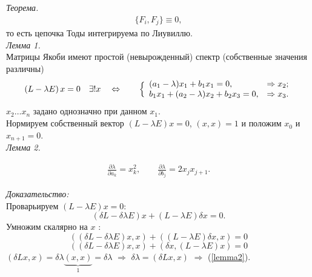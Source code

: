 \documentclass[a4paper,12pt]{article}
\theoremstyle{definition}
\theoremstyle{definition}
\theoremstyle{definition}
\newcommand{\bear}[1]{\begin{eqnarray}\label{#1}}
\newcommand{\ear}{\end{eqnarray}}
\begin{document}
\textit{Теорема.}
\bear{inv_int}
\{F_{i},F_{j}\}\equiv 0,
\ear
то есть цепочка Тоды интегрируема по Лиувиллю.\\

\textit{Лемма 1.}\\

Матрицы Якоби имеют простой (невырожденный) спектр (собственные значения различны)
\[\left(L - \lambda E\right)x = 0 \quad \exists !x \quad \Leftrightarrow \qquad\Bigl\{
                                                                    \begin{array}{ll}
                                                                      (a_{1} -\lambda)x_{1} + b_{1}x_{1} = 0 \textrm{,} & \Rightarrow x_{2}\textrm{;} \\
                                                                      b_{1}x_{1} + (a_{2} - \lambda)x_{2} + b_{2}x_{3} = 0 \textrm{,} & \Rightarrow x_{3}\textrm{.}
                                                                    \end{array} 
\]
$x_{2}\ldots x_{n}$ задано однозначно при данном $x_{1}$.\\
Нормируем собственный вектор $(L - \lambda E)x = 0$, $(x,x) = 1$ и положим $x_{0}$ и $x_{n+1} = 0$.\\

\textit{Лемма 2.}

\bear{lemma2}
\frac{\partial \lambda}{\partial a_{k}} = x^{2}_{k}, \qquad \frac{\partial \lambda}{\partial b_{j}} = 2x_{j}x_{j+1}.
\ear


\textit{Доказательство:}\\


Проварьируем $(L - \lambda E)x = 0$:\\
\[(\delta L - \delta \lambda E)x + (L - \lambda E)\delta x = 0.\]
Умножим скалярно на $x$ :
\[\left((\delta L - \delta \lambda E)x,x\right) + \left((L-\lambda E)\delta x,x \right) = 0\]
\[\left((\delta L - \delta \lambda E)x,x\right) + \left(\delta x, (L-\lambda E)x \right) = 0\]
$\left(\delta L x,x\right) = \delta \lambda \underbrace{(x,x)}_{1} = \delta \lambda$ $\Rightarrow$ $\delta\lambda = (\delta L x,x)$ $\Rightarrow$ (\ref{lemma2}).\\
\end{document}
